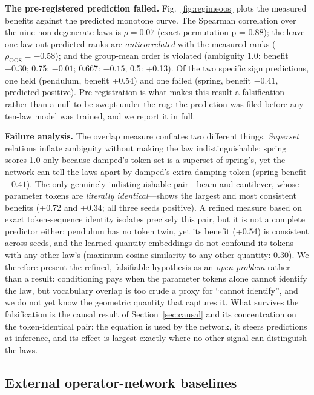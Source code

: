 \documentclass[11pt,a4paper]{article}
\begin{document}
\textbf{The pre-registered prediction failed.}
Fig.~\ref{fig:regimeoos} plots the measured benefits against the predicted
monotone curve. The Spearman correlation over the nine non-degenerate laws is
$\rho = 0.07$ (exact permutation p = 0.88); the leave-one-law-out predicted
ranks are \emph{anticorrelated} with the measured ranks
($\rho_{\mathrm{OOS}} = -0.58$); and the group-mean order is violated
(ambiguity 1.0: benefit +0.30; 0.75: $-0.01$; 0.667: $-0.15$; 0.5: +0.13).
Of the two specific sign predictions, one held (pendulum, benefit +0.54) and
one failed (spring, benefit $-0.41$, predicted positive). Pre-registration is
what makes this result a falsification rather than a null to be swept under
the rug: the prediction was filed before any ten-law model was trained, and
we report it in full.

\textbf{Failure analysis.} The overlap measure conflates two different
things. \emph{Superset} relations inflate ambiguity without making the law
indistinguishable: spring scores 1.0 only because damped's token set is a
superset of spring's, yet the network can tell the laws apart by damped's
extra damping token (spring benefit $-0.41$). The only genuinely
indistinguishable pair---beam and cantilever, whose parameter tokens are
\emph{literally identical}---shows the largest and most consistent benefits
(+0.72 and +0.34; all three seeds positive). A refined measure based on exact
token-sequence identity isolates precisely this pair, but it is not a complete
predictor either: pendulum has no token twin, yet its benefit (+0.54) is
consistent across seeds, and the learned quantity embeddings do not confound
its tokens with any other law's (maximum cosine similarity to any other
quantity: 0.30). We therefore present the refined, falsifiable hypothesis as
an \emph{open problem} rather than a result: conditioning pays when the
parameter tokens alone cannot identify the law, but vocabulary overlap is too
crude a proxy for ``cannot identify'', and we do not yet know the geometric
quantity that captures it. What survives the falsification is the causal
result of Section~\ref{sec:causal} and its concentration on the
token-identical pair: the equation is used by the network, it steers
predictions at inference, and its effect is largest exactly where no other
signal can distinguish the laws.

\subsection{External operator-network baselines}
\label{sec:deeponet}
\end{document}
